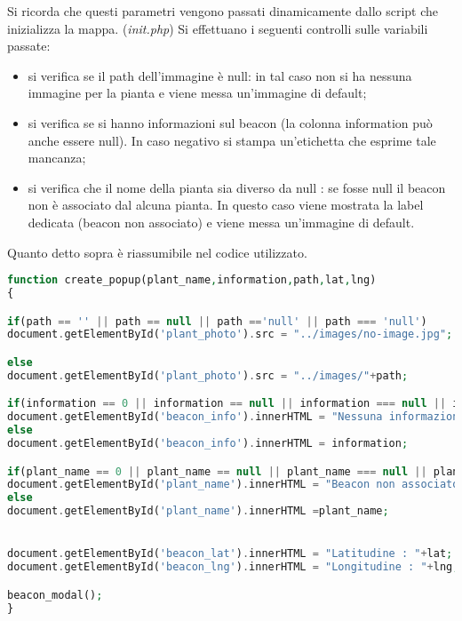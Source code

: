 Si ricorda che questi parametri vengono passati dinamicamente dallo script che inizializza la mappa. (\textit{init.php})
\newline
Si effettuano i seguenti controlli sulle variabili passate:
\begin{itemize}
\item  si verifica se il path dell'immagine è null: in tal caso non si ha nessuna immagine per la pianta e viene messa un'immagine di default;
\item si verifica se si hanno informazioni sul beacon (la colonna information può anche essere null). In caso negativo si stampa un'etichetta che esprime tale mancanza;
\item si verifica che il nome della pianta sia diverso da null : se fosse null il beacon non è associato dal alcuna pianta. In questo caso viene mostrata la label dedicata (beacon non associato) e viene messa un'immagine di default.
\end{itemize}
Quanto detto sopra è riassumibile nel codice utilizzato.

\begin{lstlisting}[language=PHP]
function create_popup(plant_name,information,path,lat,lng)
{ 

if(path == '' || path == null || path =='null' || path === 'null')
document.getElementById('plant_photo').src = "../images/no-image.jpg";

else
document.getElementById('plant_photo').src = "../images/"+path;

if(information == 0 || information == null || information === null || information =='null' || information ==='null')
document.getElementById('beacon_info').innerHTML = "Nessuna informazione per questo beacon";
else
document.getElementById('beacon_info').innerHTML = information;

if(plant_name == 0 || plant_name == null || plant_name === null || plant_name =='null' || plant_name ==='null')
document.getElementById('plant_name').innerHTML = "Beacon non associato";
else
document.getElementById('plant_name').innerHTML =plant_name;


document.getElementById('beacon_lat').innerHTML = "Latitudine : "+lat;
document.getElementById('beacon_lng').innerHTML = "Longitudine : "+lng;

beacon_modal();
}
\end{lstlisting}
